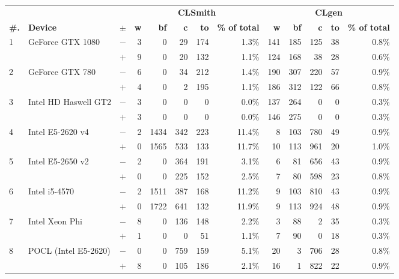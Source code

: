   \begin{tabular}{lll | rrrrr | rrrrr }
  \toprule
  & & & \multicolumn{5}{c|}{\textbf{CLSmith}} & \multicolumn{5}{c}{\textbf{CLgen}} \\
  \textbf{\#.} & \textbf{Device} & $\pm$ &
  \textbf{w} & \textbf{bf} & \textbf{c} & \textbf{to} & \textbf{\% of total} &
  \textbf{w} & \textbf{bf} & \textbf{c} & \textbf{to} & \textbf{\% of total} \\
  \midrule
  \multirow{ 2}{*}{1} & \multirow{ 2}{*}{GeForce GTX 1080} & $-$ & 3 & 0 & 29 & 174 & 1.3\%       & 141 & 185 & 125 & 38 & 0.8\% \\& & $+$ & 9 & 0 & 20 & 132 & 1.1\% & 124 & 168 & 38 & 28 & 0.6\% \\
\hline
\multirow{ 2}{*}{2} & \multirow{ 2}{*}{GeForce GTX 780} & $-$ & 6 & 0 & 34 & 212 & 1.4\%       & 190 & 307 & 220 & 57 & 0.9\% \\& & $+$ & 4 & 0 & 2 & 195 & 1.1\% & 186 & 312 & 122 & 66 & 0.8\% \\
\hline
\multirow{ 2}{*}{3} & \multirow{ 2}{*}{Intel HD Haswell GT2} & $-$ & 3 & 0 & 0 & 0 & 0.0\%       & 137 & 264 & 0 & 0 & 0.3\% \\& & $+$ & 3 & 0 & 0 & 0 & 0.0\% & 146 & 275 & 0 & 0 & 0.3\% \\
\hline
\multirow{ 2}{*}{4} & \multirow{ 2}{*}{Intel E5-2620 v4} & $-$ & 2 & 1434 & 342 & 223 & 11.4\%       & 8 & 103 & 780 & 49 & 0.9\% \\& & $+$ & 0 & 1565 & 533 & 133 & 11.7\% & 10 & 113 & 961 & 20 & 1.0\% \\
\hline
\multirow{ 2}{*}{5} & \multirow{ 2}{*}{Intel E5-2650 v2} & $-$ & 2 & 0 & 364 & 191 & 3.1\%       & 6 & 81 & 656 & 43 & 0.9\% \\& & $+$ & 0 & 0 & 225 & 152 & 2.5\% & 7 & 80 & 598 & 23 & 0.8\% \\
\hline
\multirow{ 2}{*}{6} & \multirow{ 2}{*}{Intel i5-4570} & $-$ & 2 & 1511 & 387 & 168 & 11.2\%       & 9 & 103 & 810 & 43 & 0.9\% \\& & $+$ & 0 & 1722 & 641 & 132 & 11.9\% & 9 & 113 & 924 & 48 & 0.9\% \\
\hline
\multirow{ 2}{*}{7} & \multirow{ 2}{*}{Intel Xeon Phi} & $-$ & 8 & 0 & 136 & 148 & 2.2\%       & 3 & 88 & 2 & 35 & 0.3\% \\& & $+$ & 1 & 0 & 0 & 51 & 1.1\% & 7 & 90 & 0 & 18 & 0.3\% \\
\hline
\multirow{ 2}{*}{8} & \multirow{ 2}{*}{POCL (Intel E5-2620)} & $-$ & 0 & 0 & 759 & 159 & 5.1\%       & 20 & 3 & 706 & 28 & 0.8\% \\& & $+$ & 8 & 0 & 105 & 186 & 2.1\% & 16 & 1 & 822 & 22 & 0.9\% \\

\end{tabular}
